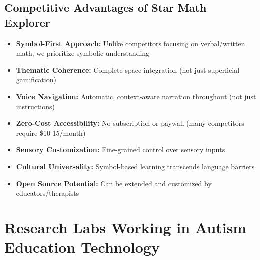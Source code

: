 \documentclass[12pt, a4paper]{article}
\begin{document}
\subsection{Competitive Advantages of Star Math Explorer}

\begin{itemize}[leftmargin=*, itemsep=8pt]
    \item \textbf{Symbol-First Approach:} Unlike competitors focusing on verbal/written math, we prioritize symbolic understanding
    \item \textbf{Thematic Coherence:} Complete space integration (not just superficial gamification)
    \item \textbf{Voice Navigation:} Automatic, context-aware narration throughout (not just instructions)
    \item \textbf{Zero-Cost Accessibility:} No subscription or paywall (many competitors require \$10-15/month)
    \item \textbf{Sensory Customization:} Fine-grained control over sensory inputs
    \item \textbf{Cultural Universality:} Symbol-based learning transcends language barriers
    \item \textbf{Open Source Potential:} Can be extended and customized by educators/therapists
\end{itemize}

\section{Research Labs Working in Autism Education Technology}
\end{document}
